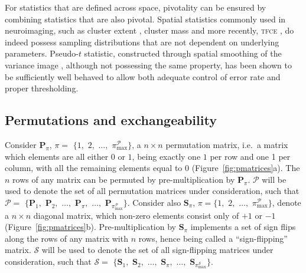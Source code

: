 For statistics that are defined across space, pivotality can be ensured by combining statistics that are also pivotal. Spatial statistics commonly used in neuroimaging, such as cluster extent \citep{Friston1993, Forman1995}, cluster mass \citep{Bullmore1996} and more recently, \textsc{tfce} \citep{Smith2009}, do indeed possess sampling distributions that are not dependent on underlying parameters. Pseudo-$t$ statistic, constructed through spatial smoothing of the variance image \citep{Holmes1996}, although not possessing the same property, has been shown to be sufficiently well behaved to allow both adequate control of error rate and proper thresholding.


\subsection{Permutations and exchangeability}

Consider $\mathbf{P}_{\pi}$, $\pi =$ $\{ 1,$ $2,$ $\ldots,$ $\pi^{\mathcal{P}}_{\text{max}} \}$, a $n \times n$ permutation matrix, i.e.\ a matrix which elements are all either $0$ or $1$, being exactly one $1$ per row and one 1 per column, with all the remaining elements equal to $0$ (Figure~\ref{fig:pmatrices}a). The $n$ rows of any matrix can be permuted by pre-multiplication by $\mathbf{P}_{\pi}$. $\mathcal{P}$ will be used to denote the set of all permutation matrices under consideration, such that $\mathcal{P}=$ $\{\mathbf{P}_{1},$ $\mathbf{P}_{2},$ $\ldots,$ $\mathbf{P}_{\pi},$ $\ldots,$ $\mathbf{P}_{\pi^{\mathcal{P}}_{\text{max}}} \}$. Consider also $\mathbf{S}_{\pi}$, $\pi =\{ 1,$ $2,$ $\ldots,$ $\pi^{\mathcal{P}}_{\text{max}}\}$, denote a $n \times n$ diagonal matrix, which non-zero elements consist only of $+1$ or $-1$ (Figure~\ref{fig:pmatrices}b). Pre-multiplication by $\mathbf{S}_{\pi}$ implements a set of sign flips along the rows of any matrix with $n$ rows, hence being called a ``sign-flipping'' matrix. $\mathcal{S}$ will be used to denote the set of all sign-flipping matrices under consideration, such that $\mathcal{S}=$ $\{\mathbf{S}_{1},$ $\mathbf{S}_{2},$ $\ldots,$ $\mathbf{S}_{\pi},$ $\ldots,$ $\mathbf{S}_{\pi^{\mathcal{S}}_{\text{max}}}\}$.

